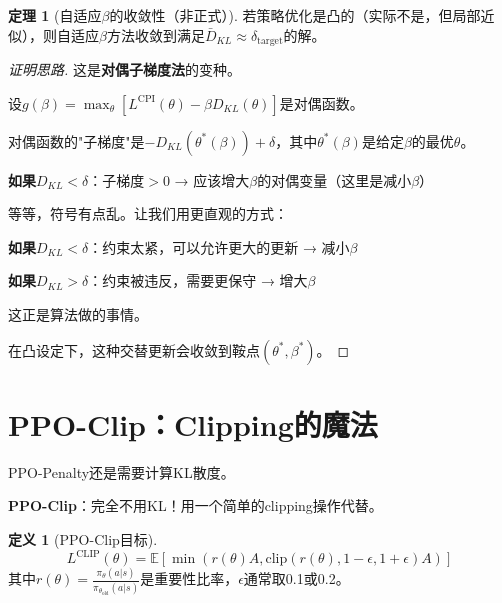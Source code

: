 \documentclass[11pt,a4paper]{article}
\theoremstyle{definition}
\newtheorem{definition}{定义}[section]
\newtheorem{theorem}{定理}[section]
\begin{document}
\begin{theorem}[自适应$\beta$的收敛性（非正式）]
若策略优化是凸的（实际不是，但局部近似），则自适应$\beta$方法收敛到满足$\bar{D}_{KL} \approx \delta_{\text{target}}$的解。
\end{theorem}

\begin{proof}[证明思路]
这是\textbf{对偶子梯度法}的变种。

设$g(\beta) = \max_\theta [L^{\text{CPI}}(\theta) - \beta D_{KL}(\theta)]$是对偶函数。

对偶函数的"子梯度"是$-D_{KL}(\theta^*(\beta)) + \delta$，其中$\theta^*(\beta)$是给定$\beta$的最优$\theta$。

\textbf{如果$D_{KL} < \delta$}：子梯度$> 0$ → 应该增大$\beta$的对偶变量（这里是减小$\beta$）

等等，符号有点乱。让我们用更直观的方式：

\textbf{如果$D_{KL} < \delta$}：约束太紧，可以允许更大的更新 → 减小$\beta$

\textbf{如果$D_{KL} > \delta$}：约束被违反，需要更保守 → 增大$\beta$

这正是算法做的事情。

在凸设定下，这种交替更新会收敛到鞍点$(\theta^*, \beta^*)$。
\end{proof}

\section{PPO-Clip：Clipping的魔法}

\begin{plainwords}[PPO的核心创新]
PPO-Penalty还是需要计算KL散度。

\textbf{PPO-Clip}：完全不用KL！用一个简单的clipping操作代替。
\end{plainwords}

\begin{definition}[PPO-Clip目标]
\[
L^{\text{CLIP}}(\theta) = \mathbb{E}\left[\min\left(r(\theta) A, \text{clip}(r(\theta), 1-\epsilon, 1+\epsilon) A\right)\right]
\]
其中$r(\theta) = \frac{\pi_\theta(a|s)}{\pi_{\theta_{\text{old}}}(a|s)}$是重要性比率，$\epsilon$通常取0.1或0.2。
\end{definition}
\end{document}
